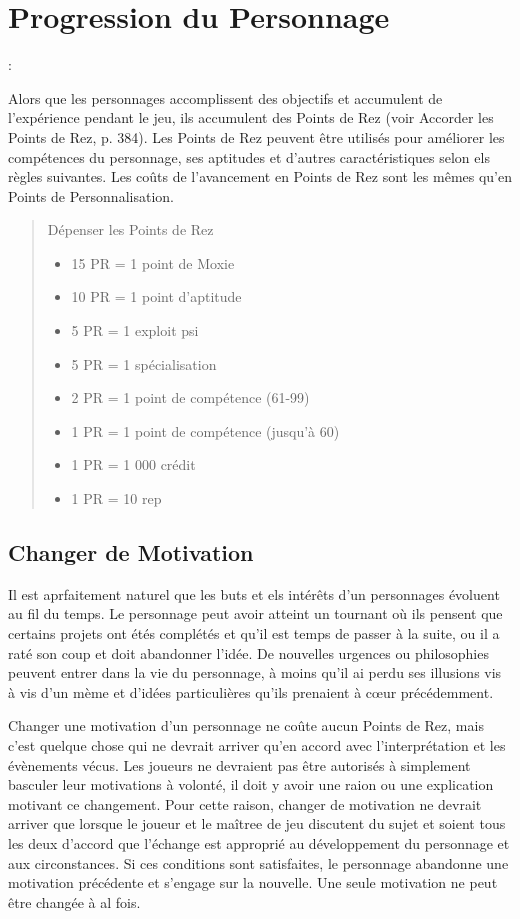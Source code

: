 \section{Progression du Personnage}: \label{sec:character-advancement} 

Alors que les personnages accomplissent des objectifs et accumulent de l'expérience pendant le jeu, ils accumulent des Points de Rez (voir Accorder les Points de Rez, p. 384). Les Points de Rez peuvent être utilisés pour améliorer les compétences du personnage, ses aptitudes et d'autres caractéristiques selon els règles suivantes. Les coûts de l'avancement en Points de Rez sont les mêmes qu'en Points de Personnalisation. 

\begin{quotation} Dépenser les Points de Rez 

\begin{itemize} \item 15 PR = 1 point de Moxie \item 10 PR = 1 point d'aptitude \item 5 PR = 1 exploit psi \item 5 PR = 1 spécialisation \item 2 PR = 1 point de compétence (61-99) \item 1 PR = 1 point de compétence (jusqu'à 60) \item 1 PR = 1 000 crédit \item 1 PR = 10 rep \end{itemize} \end{quotation} 

\subsection{Changer de Motivation} \label{sec:changing-motivation} 

Il est aprfaitement naturel que les buts et els intérêts d'un personnages évoluent au fil du temps. Le personnage peut avoir atteint un tournant où ils pensent que certains projets ont étés complétés et qu'il est temps de passer à la suite, ou il a raté son coup et doit abandonner l'idée. De nouvelles urgences ou philosophies peuvent entrer dans la vie du personnage, à moins qu'il ai perdu ses illusions vis à vis d'un mème et d'idées particulières qu'ils prenaient à cœur précédemment. 

Changer une motivation d'un personnage ne coûte aucun Points de Rez, mais c'est quelque chose qui ne devrait arriver qu'en accord avec l'interprétation et les évènements vécus. Les joueurs ne devraient pas être autorisés à simplement basculer leur motivations à volonté, il doit y avoir une raion ou une explication motivant ce changement. Pour cette raison, changer de motivation ne devrait arriver que lorsque le joueur et le maîtree de jeu discutent du sujet et soient tous les deux d'accord que l'échange est approprié au développement du personnage et aux circonstances. Si ces conditions sont satisfaites, le personnage abandonne une motivation précédente et s'engage sur la nouvelle. Une seule motivation ne peut être changée à al fois. 

